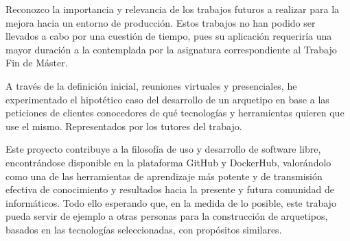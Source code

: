 Reconozco la importancia y relevancia de los trabajos futuros a realizar para la mejora hacia un entorno de producción. Estos trabajos no han podido ser llevados a cabo por una cuestión de tiempo, pues su aplicación requeriría una mayor duración a la contemplada por la asignatura correspondiente al Trabajo Fin de Máster.

A través de la definición inicial, reuniones virtuales y presenciales, he experimentado el hipotético caso del desarrollo de un arquetipo en base a las peticiones de clientes conocedores de qué tecnologías y herramientas quieren que use el mismo. Representados por los tutores del trabajo. 

Este proyecto contribuye a la filosofía de uso y desarrollo de software libre, encontrándose disponible en la plataforma GitHub y DockerHub, valorándolo como una de las herramientas de aprendizaje más potente y de transmisión efectiva de conocimiento y resultados hacia la presente y futura comunidad de informáticos. Todo ello esperando que, en la medida de lo posible, este trabajo pueda servir de ejemplo a otras personas para la construcción de arquetipos, basados en las tecnologías seleccionadas, con propósitos similares.

